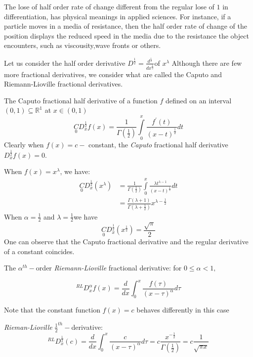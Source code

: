 \documentclass{amsart}%
\providecommand{\U}[1]{\protect\rule{.1in}{.1in}}
\theoremstyle{plain}
\numberwithin{equation}{section}
\begin{document}
The lose of half order rate of change different from the regular lose of $1$
in differentiation, has physical meanings in applied sciences. For instance,
if a particle moves in a media of resistance, then the half order rate of
change of the position displays the reduced speed in the media due to the
resistance the object encounters, such as viscousity,wave fronts or others.

Let us consider the half order derivative $D^{\frac{1}{2}}=\frac{d^{\frac
{1}{2}}}{dx^{\frac{1}{2}}}$of $x^{\lambda}$ Although there are few more
fractional derivatives, we consider what are called the Caputo and
Riemann-Lioville fractional derivatives.

The Caputo fractional half derivative of a function $f$ defined on an interval
$(0,1)\subseteq%
\mathbb{R}
^{1}$ at $x\in\left(  0,1\right)  $%
\[
\underset{0}{C}D_{x}^{\frac{1}{2}}f(x)=\frac{1}{\Gamma\left(  \frac{1}%
{2}\right)  }%
{\displaystyle\int\limits_{0}^{x}}
\frac{f^{\prime}\left(  t\right)  }{\left(  x-t\right)  ^{\frac{1}{2}}}dt
\]
Clearly when $f(x)=c-$ constant, the \textit{Caputo} fractional half
derivative $D_{x}^{\frac{1}{2}}f(x)=0$.

When $f(x)=x^{\lambda}$, we have:
\begin{align*}
\underset{0}{C}D_{x}^{\frac{1}{2}}(x^{\lambda})  & =\frac{1}{\Gamma\left(
\frac{1}{2}\right)  }%
{\displaystyle\int\limits_{0}^{x}}
\frac{\lambda t^{\lambda-1}}{\left(  x-t\right)  ^{\frac{1}{2}}}dt\\
& =\frac{\Gamma\left(  \lambda+1\right)  }{\Gamma\left(  \lambda+\frac{1}%
{2}\right)  }x^{\lambda-\frac{1}{2}}%
\end{align*}
When $\alpha=\frac{1}{2}$ and $\lambda=\frac{1}{2}$we have
\[
\underset{0}{C}D_{x}^{\frac{1}{2}}(x^{\frac{1}{2}})=\frac{\sqrt{\pi}}{2}%
\]
One can observe that the Caputo fractional derivative and the regular
derivative of a constant coincides.

The $\alpha^{th}-$order \textit{Riemann-Lioville} fractional derivative: for
$0\leq\alpha<1,$%

\[
^{RL}D_{x}^{\alpha}f(x)=\frac{d}{dx}\int_{0}^{x}\frac{f(\tau)}{\left(
x-\tau\right)  ^{\alpha}}d\tau
\]


Note that the constant function $f(x)=c$ behaves differently in this case

\textit{Rieman-Lioville} $\frac{1}{2}^{th}-$derivative:
\[
^{RL}D_{x}^{\frac{1}{2}}(c)=\frac{d}{dx}\int_{0}^{x}\frac{c}{\left(
x-\tau\right)  ^{\alpha}}d\tau=c\frac{x^{-\frac{1}{2}}}{\Gamma\left(  \frac
{1}{2}\right)  }=c\frac{1}{\sqrt{\pi x}}%
\]
\end{document}
